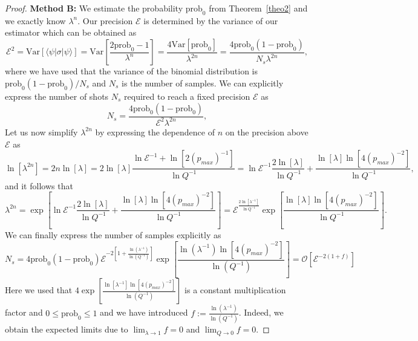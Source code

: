 \documentclass[aps,prx,showpacs,twocolumn,reprint]{revtex4-2}
\newcommand{\var}{\mathrm{Var}}
\newcommand{\prob}{\mathrm{prob}_0}
\begin{document}
{\begin{proof}
	\textbf{Method B:} We estimate the probability $\prob$ from Theorem~\ref{theo2} and we exactly
	know $\lambda^n$. Our precision $\mathcal{E}$ is determined by the variance of our estimator which 
	can be obtained as
	\begin{equation}
	\mathcal{E}^2 = \var[ \langle\psi |\sigma | \psi \rangle]
	=
	\var[\frac{2\prob-1}{\lambda^n}]
	= \frac{4\var[\prob]}{\lambda^{2n}}
	= \frac{4\prob(1-\prob)}{N_s \lambda^{2n}},
	\end{equation}
	where we have used that the variance of the binomial distribution is $\prob(1-\prob)/N_s$
	and $N_s$ is the number of samples.
	We can explicitly express the number of shots $N_s$ required to reach a fixed precision
	$\mathcal{E}$ as
		\begin{equation}
	N_s 
	= \frac{4\prob(1-\prob)}{\mathcal{E}^2  \lambda^{2n}},
	\end{equation}
	Let us now simplify $\lambda^{2n}$ by
	expressing the dependence of $n$ on the precision above $\mathcal{E}$ as
	\begin{equation*}
	\ln [ \lambda^{2n} ] = 2n \ln[\lambda]
	=
	2\ln[\lambda]
	 \frac{\ln \mathcal{E}^{-1} + \ln{[2   (p_{max})^{{-}1}  ]}   }{\ln Q^{-1}}
	 =
	 	 \ln \mathcal{E}^{-1} \frac{2 \ln[\lambda]}{\ln Q^{-1}} + \frac{\ln[\lambda]  \ln{[4    (p_{max})^{{-}2}  ]}  }{\ln Q^{-1}},
	\end{equation*}
	and it follows that
		\begin{equation} \label{lambdapower}
	\lambda^{2n}
	=
	\exp[
	\ln \mathcal{E}^{-1} \frac{2 \ln[\lambda]}{\ln Q^{-1}} + \frac{\ln[\lambda]   \ln{[4   (p_{max})^{{-}2}   ]}    }{\ln Q^{-1}}]
	=
	\mathcal{E}^{ \frac{2 \ln[\lambda^{-1}]}{\ln Q^{-1}} } \exp[\frac{\ln[\lambda]   \ln{[4    (p_{max})^{{-}2}   ]}   }{\ln Q^{-1}}].
	\end{equation}
	We can finally express the number of samples explicitly as
		\begin{equation}
		N_s 
		= 4\prob(1-\prob) \mathcal{E}^{-2 [1+ \frac{\ln(\lambda^{-1})}{\ln (Q^{-1})}] } \exp[\frac{\ln (\lambda^{-1})   \ln{[4    (p_{max})^{{-}2}  ]}     }{\ln (Q^{-1})}]
		=\mathcal{O}[ \mathcal{E}^{-2 (1+f) } ]
		\end{equation}
	Here we used that $4 \exp[\frac{\ln[\lambda^{-1}]   \ln{[4   (p_{max})^{{-}2}   ]}     }{\ln (Q^{-1})}]$ is a constant multiplication factor
	and $0 \leq \prob \leq 1$ and we have introduced $f := \frac{\ln(\lambda^{-1})}{\ln (Q^{-1})}$.
	Indeed, we obtain the expected limits due to  $\lim_{\lambda\rightarrow1} f = 0$ and $\lim_{Q\rightarrow0} f= 0$.
	

\end{proof}}
\end{document}
